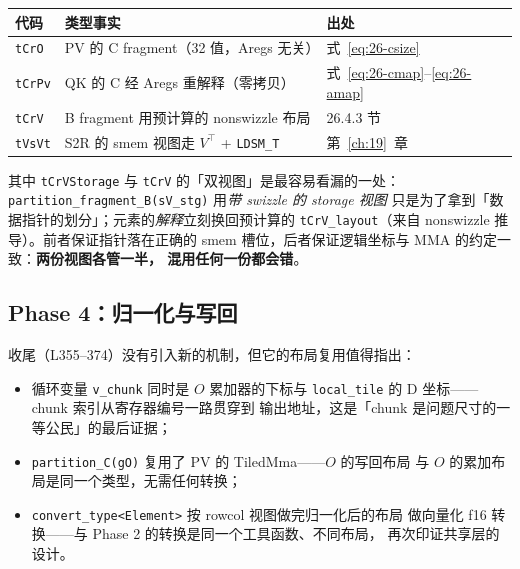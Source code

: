\begin{center}
\begin{tabular}{p{4.6cm}p{6.4cm}p{4.2cm}}
\toprule
代码 & 类型事实 & 出处 \\
\midrule
\texttt{tCrO} & PV 的 C fragment（32 值，Aregs 无关） & 式~\eqref{eq:26-csize} \\
\texttt{tCrPv} & QK 的 C 经 Aregs 重解释（零拷贝） & 式~\eqref{eq:26-cmap}--\eqref{eq:26-amap} \\
\texttt{tCrV} & B fragment 用预计算的 nonswizzle 布局 & 26.4.3 节 \\
\texttt{tVsVt} & S2R 的 smem 视图走 $V^\top$ + \texttt{LDSM\_T} & 第~\ref{ch:19}~章 \\
\bottomrule
\end{tabular}
\end{center}

其中 \texttt{tCrVStorage} 与 \texttt{tCrV} 的「双视图」是最容易看漏的一处：
\texttt{partition\_\allowbreak{}fragment\_\allowbreak{}B(sV\_stg)} 用\emph{带 swizzle 的 storage 视图}
只是为了拿到「数据指针的划分」；元素的\emph{解释}立刻换回预计算的
\texttt{tCrV\_layout}（来自 nonswizzle 推导）。前者保证指针落在正确的 smem
槽位，后者保证逻辑坐标与 MMA 的约定一致：\textbf{两份视图各管一半，
混用任何一份都会错}。

\subsection{Phase 4：归一化与写回}

收尾（L355--374）没有引入新的机制，但它的布局复用值得指出：



\begin{itemize}[itemsep=2pt,topsep=2pt]
  \item 循环变量 \texttt{v\_chunk} 同时是 $O$ 累加器的下标与
        \texttt{local\_tile} 的 D 坐标——chunk 索引从寄存器编号一路贯穿到
        输出地址，这是「chunk 是问题尺寸的一等公民」的最后证据；
  \item \texttt{partition\_\allowbreak{}C\allowbreak{}(g\allowbreak{}O)} 复用了 PV 的 TiledMma——$O$ 的写回布局
        与 $O$ 的累加布局是同一个类型，无需任何转换；
  \item \texttt{convert\_\allowbreak{}type\allowbreak{}<Element>} 按 rowcol 视图做完归一化后的布局
        做向量化 f16 转换——与 Phase 2 的转换是同一个工具函数、不同布局，
        再次印证共享层的设计。
\end{itemize}

